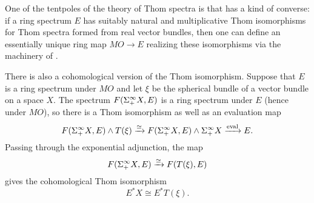 \begin{remark}
One of the tentpoles of the theory of Thom spectra is that  has a kind of converse: if a ring spectrum $E$ has suitably natural and multiplicative Thom isomorphisms for Thom spectra formed from real vector bundles, then one can define an essentially unique ring map $MO \to E$ realizing these isomorphisms via the machinery of .
\end{remark}

\begin{remark}\label{CohomologicalThomIso}
There is also a cohomological version of the Thom isomorphism.  Suppose that $E$ is a ring spectrum under $MO$ and let $\xi$ be the spherical bundle of a vector bundle on a space $X$.  The spectrum $F(\Sigma^\infty_+ X, E)$ is a ring spectrum under $E$ (hence under $MO$), so there is a Thom isomorphism as well as an evaluation map \[F(\Sigma^\infty_+ X, E) \wedge T(\xi) \xrightarrow{\simeq} F(\Sigma^\infty_+ X, E) \wedge \Sigma^\infty_+ X \xrightarrow{\operatorname{eval}} E.\]  Passing through the exponential adjunction, the map \[F(\Sigma^\infty_+ X, E) \xrightarrow{\simeq} F(T(\xi), E)\] gives the cohomological Thom isomorphism \[E^* X \cong E^* T(\xi).\]
\end{remark}

